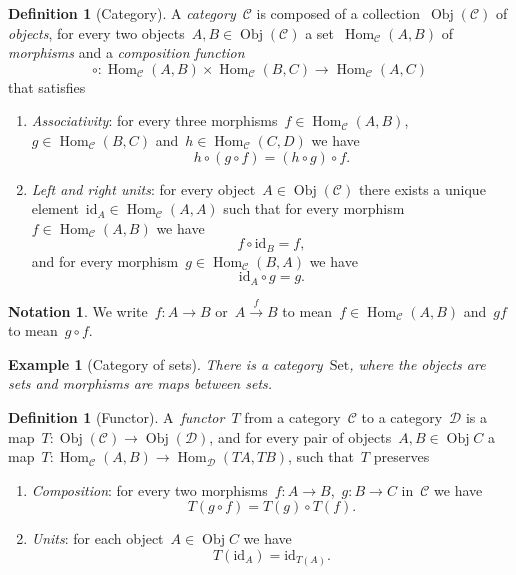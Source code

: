 \documentclass[a4paper]{article}
\theoremstyle{plain}
\newtheorem{example}[theorem]{Example}
\theoremstyle{definition}
\newtheorem{definition}[theorem]{Definition}
\newtheorem{notation}[theorem]{Notation}
\DeclareMathOperator{\Obj}{Obj}
\DeclareMathOperator{\Hom}{Hom}
\newcommand{\id}{\mathrm{id}}
\newcommand{\Set}{\mathrm{Set}}
\newcommand{\cat}[1]{\mathcal{#1}}
\begin{document}
\begin{definition}[Category]
    \label{def:category}
    A \emph{category}~\(\cat{C}\) is composed of a collection~\(\Obj(\cat{C})\)
    of \emph{objects}, for every two objects~\(A,B\in\Obj(\cat{C})\) a
    set~\(\Hom_{\cat{C}}(A,B)\) of \emph{morphisms} and a \emph{composition
    function}
    \[
        \circ:\Hom_{\cat{C}}(A,B)\times\Hom_{\cat{C}}(B,C) \longrightarrow
        \Hom_{\cat{C}}(A,C)
    \]
    that satisfies
    \begin{enumerate}
        \item \emph{Associativity}: for every three
            morphisms~\(f\in\Hom_{\cat{C}}(A,B)\),~\(g\in\Hom_{\cat{C}}(B,C)\)
            and~\(h\in\Hom_{\cat{C}}(C,D)\)
            we have
            \[
                h \circ (g \circ f) = (h \circ g) \circ f.
            \]
        \item \emph{Left and right units}: for every
            object~\(A\in\Obj(\cat{C})\) there exists a unique
            element~\(\id_{A}\in\Hom_{\cat{C}}(A,A)\)
            such that for every morphism~\(f\in\Hom_{\cat{C}}(A,B)\) we have
            \[
                f \circ \id_{B} = f,
            \]
            and for every morphism~\(g\in\Hom_{\cat{C}}(B,A)\) we have
            \[
                \id_{A} \circ g = g.
            \]
    \end{enumerate}
\end{definition}

\begin{notation}
    We write~\(f:A\longrightarrow B\) or~\(A\overset{f}{\longrightarrow}B\) to
    mean~\(f\in\Hom_{\cat{C}}(A,B)\) and~\(gf\) to mean~\(g\circ f\).
\end{notation}

\begin{example}[Category of sets]
    \label{cat:set}
    There is a category~\(\Set\), where the objects are sets and morphisms are
    maps between sets.
\end{example}

\begin{definition}[Functor]
    \label{def:functor}
    A~\emph{functor}~\(T\) from a category~\(\cat{C}\) to a category~\(\cat{D}\)
    is a map~\(T:\Obj(\cat{C})\longrightarrow\Obj(\cat{D})\), and for every
    pair of objects~\(A,B\in\Obj{C}\) a
    map~\(T:\Hom_{\cat{C}}(A,B)\longrightarrow\Hom_{\cat{D}}(TA,TB)\),
    such that~\(T\) preserves
    \begin{enumerate}
        \item \emph{Composition}: for every two
            morphisms~\(f:A\longrightarrow B\),~\(g:B\longrightarrow C\)
            in~\(\cat{C}\) we have
            \[
                T(g \circ f) = T(g) \circ T(f).
            \]
        \item \emph{Units}: for each object~\(A\in\Obj{C}\) we have
            \[
                T(\id_{A}) = \id_{T(A)}.
            \]
    \end{enumerate}
\end{definition}
\end{document}
